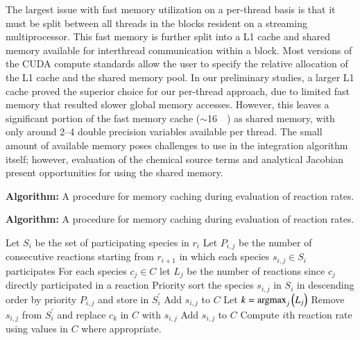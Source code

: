 \documentclass[final,twocolumn]{elsarticle}
\newcommand{\argmax}{\operatornamewithlimits{argmax}}
\begin{document}
The largest issue with fast memory utilization on a per-thread basis is that it must be split between all threads in the blocks resident on a streaming multiprocessor.
This fast memory is further split into a L1 cache and shared memory available for interthread communication within a block.
Most versions of the CUDA compute standards allow the user to specify the relative allocation of the L1 cache and the shared memory pool.
In our preliminary studies, a larger L1 cache proved the superior choice for our per-thread approach, due to limited fast memory that resulted slower global memory accesses.
However, this leaves a significant portion of the fast memory cache ($\sim$\SI{16}{\kilo\byte}) as shared memory, with only around \numrange{2}{4} double precision variables available per thread.
The small amount of available memory poses challenges to use in the integration algorithm itself; however, evaluation of the chemical source terms and analytical Jacobian present opportunities for using the shared memory.

\begin{algorithm}[htb]
\ifmeasure
\fontsize{8pt}{10pt}\selectfont
\caption{\fontsize{9pt}{10pt}\selectfont \textbf{Algorithm:} A procedure for memory caching during evaluation of reaction rates.\label{A:shared_mem_caching}}
\else
\caption{\textbf{Algorithm:} A procedure for memory caching during evaluation of reaction rates.\label{A:shared_mem_caching}}
\fi
\begin{algorithmic}[0]
    \State Let $S_i$ be the set of participating species in $r_i$
    \State Let $P_{i,j}$ be the number of consecutive reactions starting from $r_{i + 1}$ in which each species $s_{i,j} \in S_i$ participates
    \State For each species $c_j \in C$ let $L_j$ be the number of reactions since $c_j$ directly participated in a reaction
    \State Priority sort the species $s_{i,j}$ in $S_{i}$ in descending order by priority $P_{i,j}$ and store in $S_{i}^{\prime}$
		\State Add $s_{i,j}$ to $C$
	  \State Let $k = \argmax_j \left(L_j \right)$
	  \State Remove $s_{i,j}$ from $S_{i}^{\prime}$ and replace $c_k$ in $C$ with $s_{i,j}$
      \EndIf
    \EndFor
		\State Add $s_{i,j}$ to $C$
      \EndIf
    \EndFor
    \State Compute $i$th reaction rate using values in $C$ where appropriate.
  \EndFor
\end{algorithmic}
\end{algorithm}
\end{document}
